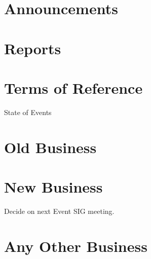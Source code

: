 \documentclass[11pt,hacksoc,agenda]{meetingmins}
\begin{document}
\maketitle

\section{Announcements}
\begin{items}
  \item {}
\end{items}

\section{Reports}

\section{Terms of Reference}
\begin{items}
  \item {State of Events}
\end{items}

\section{Old Business}

\section{New Business}
\begin{items}
  \item {}

  \item {Decide on next Event SIG meeting.}

\end{items}

\section{Any Other Business}

\vspace{1em}
\end{document}
